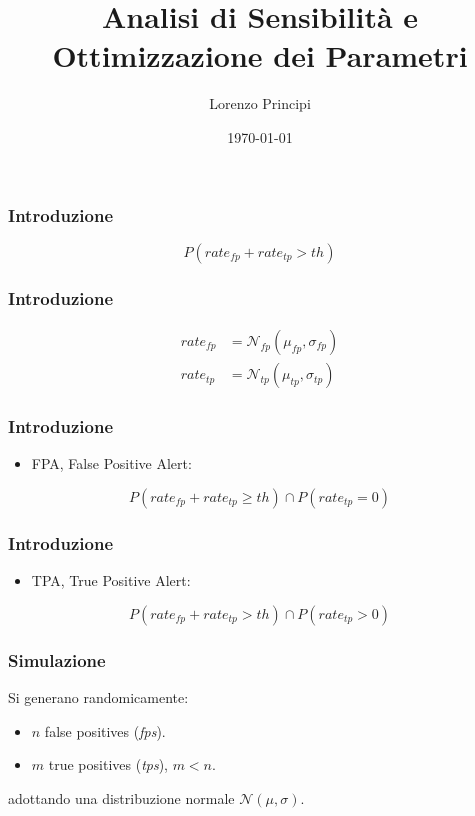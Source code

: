 \documentclass{beamer}
\title{Analisi di Sensibilità e Ottimizzazione dei Parametri}
\author{Lorenzo Principi}
\date{\today}
\begin{document}
\frame{\titlepage}

\begin{frame}
    \frametitle{Introduzione}

    \begin{equation}
        P(rate_{fp} + rate_{tp} > th)
    \end{equation}

\end{frame}



\begin{frame}
    \frametitle{Introduzione}

    \begin{align}
        rate_{fp} &= \mathcal{N}_{fp}(\mu_{fp}, \sigma_{fp}) \\
        rate_{tp} &= \mathcal{N}_{tp}(\mu_{tp}, \sigma_{tp})
    \end{align}
    
\end{frame}



\begin{frame}
    \frametitle{Introduzione}
    \begin{itemize}
        \item FPA, False Positive Alert:
    \end{itemize}

    \begin{equation}
        P(rate_{fp} + rate_{tp} \ge th) \cap P(rate_{tp} = 0)
    \end{equation}
\end{frame}



\begin{frame}
    \frametitle{Introduzione}
    \begin{itemize}
        \item TPA, True Positive Alert:
    \end{itemize}

    \begin{equation}
        P(rate_{fp} + rate_{tp} > th) \cap P(rate_{tp} > 0)
    \end{equation}
\end{frame}






\begin{frame}
    \frametitle{Simulazione}
    Si generano randomicamente:
    \begin{itemize}
        \item $n$ false positives (\textit{fps}).
        \item $m$ true positives (\textit{tps}), $m < n$.
    \end{itemize}
    adottando una distribuzione normale $\mathcal{N}(\mu,\sigma)$.
\end{frame}
\end{document}
